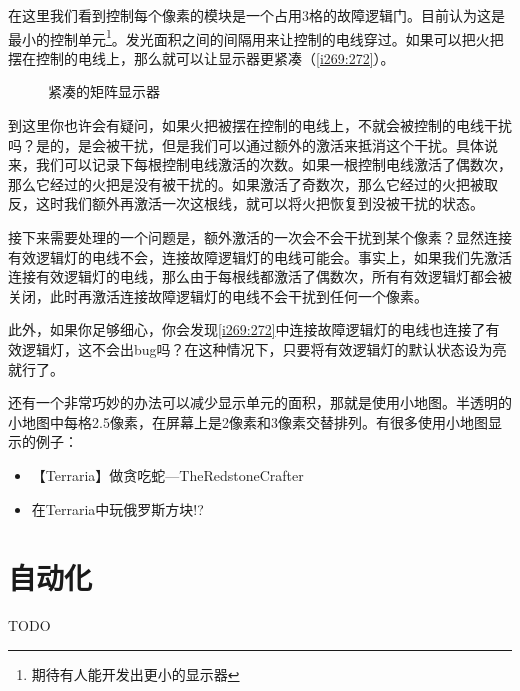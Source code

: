 在这里我们看到控制每个像素的模块是一个占用3格的故障逻辑门。目前认为这是最小的控制单元\footnote{期待有人能开发出更小的显示器}。发光面积之间的间隔用来让控制的电线穿过。如果可以把火把摆在控制的电线上，那么就可以让显示器更紧凑（\autoref{i269:272}）。
\begin{figure}[!ht]
\begin{center}
%
%
\end{center}
\caption{紧凑的矩阵显示器}
\label{i269:272}
\end{figure}

到这里你也许会有疑问，如果火把被摆在控制的电线上，不就会被控制的电线干扰吗？是的，是会被干扰，但是我们可以通过额外的激活来抵消这个干扰。具体说来，我们可以记录下每根控制电线激活的次数。如果一根控制电线激活了偶数次，那么它经过的火把是没有被干扰的。如果激活了奇数次，那么它经过的火把被取反，这时我们额外再激活一次这根线，就可以将火把恢复到没被干扰的状态。

接下来需要处理的一个问题是，额外激活的一次会不会干扰到某个像素？显然连接有效逻辑灯的电线不会，连接故障逻辑灯的电线可能会。事实上，如果我们先激活连接有效逻辑灯的电线，那么由于每根线都激活了偶数次，所有有效逻辑灯都会被关闭，此时再激活连接故障逻辑灯的电线不会干扰到任何一个像素。

此外，如果你足够细心，你会发现\autoref{i269:272}中连接故障逻辑灯的电线也连接了有效逻辑灯，这不会出bug吗？在这种情况下，只要将有效逻辑灯的默认状态设为亮就行了。

还有一个非常巧妙的办法可以减少显示单元的面积，那就是使用小地图。半透明的小地图中每格2.5像素，在屏幕上是2像素和3像素交替排列。有很多使用小地图显示的例子：
\begin{itemize}
\item 【Terraria】做贪吃蛇—TheRedstoneCrafter 
\item 在Terraria中玩俄罗斯方块!? 
\end{itemize}

\section{自动化}
TODO